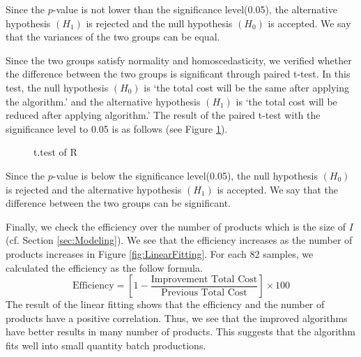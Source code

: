 \documentclass[review]{elsarticle}
\begin{document}
Since the $p$-value is not lower than the significance level(0.05), the alternative hypothesis $(H_{1})$ is rejected and the null hypothesis $(H_{0})$ is accepted. 
We say that the variances of the two groups can be equal.

Since the two groups satisfy normality and homoscedasticity, we verified whether the difference between the two groups is significant through paired t-test. In this test, the null hypothesis $(H_{0})$ is `the total cost will be the same after applying the algorithm.' and the alternative hypothesis $(H_{1})$ is `the total cost will be reduced after applying algorithm.' The result of the paired t-test with the significance level to 0.05 is as follows (see Figure \ref{fig:ttest}).

\begin{figure}[h!]
	\centering
	\caption{t.test of R}
	\label{fig:ttest}       %
\end{figure}

Since the $p$-value is below the significance level(0.05), the null hypothesis $(H_{0})$ is rejected and the alternative hypothesis $(H_{1})$ is accepted. We say that the difference between the two groups can be significant.

Finally, we check the efficiency over the number of products which is the size of $I$(cf. Section \ref{sec:Modeling}).
We see that the efficiency increases as the number of products increases in Figure \ref{fig:LinearFitting}.
For each 82 samples, we calculated the efficiency as the follow formula.
\begin{equation}
\textrm{Efficiency} = \left[1-\frac{\textrm{Improvement~Total~Cost}}{\textrm{Previous~Total~Cost}}\right]\times 100
\end{equation}
The result of the linear fitting shows that the efficiency and the number of products have a positive correlation.
Thus, we see that the improved algorithms have better results in many number of products.
This suggests that the algorithm fits well into small quantity batch productions.
\end{document}
